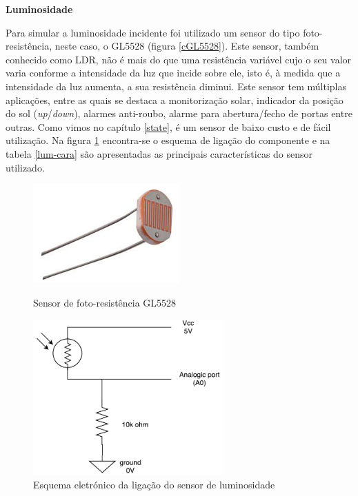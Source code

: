 \textbf{Luminosidade}

Para simular a luminosidade incidente foi utilizado um sensor do tipo foto-resistência, neste caso, o GL5528 (figura \ref{cGL5528}). Este sensor, também conhecido como \ac{LDR}, não é mais do que uma resistência variável cujo o seu valor varia conforme a intensidade da luz que incide sobre ele, isto é, à medida que a intensidade da luz aumenta, a sua resistência diminui. Este sensor tem múltiplas aplicações, entre as quais se destaca a monitorização solar, indicador da posição do sol (\textit{up}/\textit{down}), alarmes anti-roubo, alarme para abertura/fecho de portas entre outras. Como vimos no capítulo \ref{state}, é um sensor de baixo custo e de fácil utilização. Na figura \ref{lum-esquema} encontra-se o esquema de ligação do componente e na tabela \ref{lum-cara} são apresentadas as principais características do sensor utilizado. 


\begin{figure}[h]
	\centering
	\begin{minipage}[b]{0.49\textwidth}
		\centering
		\includegraphics[width=0.5\textwidth]{img/hardware/luminosidade.png}
		\caption{Sensor de foto-resistência GL5528}
		\label{cGL5528}
	\end{minipage}
	\hfill
	\begin{minipage}[b]{0.49\textwidth}
		\centering
		\includegraphics[width=0.65\textwidth]{img/hardware/lumi_esquema.pdf}
		\caption{Esquema eletrónico da ligação do sensor de luminosidade}
		\label{lum-esquema}
	\end{minipage}
\end{figure}

